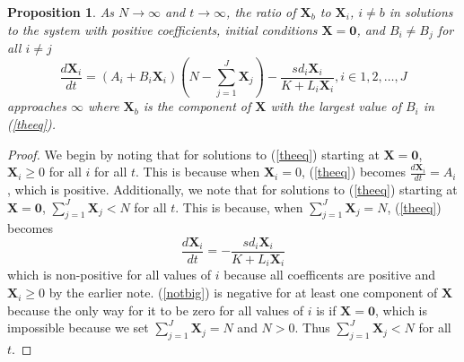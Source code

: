 \documentclass{article}
\newtheorem{prop}{Proposition}
\begin{document}
\begin{prop}
  As $N \rightarrow \infty$ and $t \rightarrow \infty$, the ratio of $\mathbf{X}_b$ to $\mathbf{X}_i$, $i\ne b$ in solutions to the system with positive coefficients, initial conditions $\mathbf{X} = \mathbf{0}$, and $B_i \ne B_j$ for all $i \ne j$
  \begin{equation}
    \frac{d \mathbf{X}_i}{dt} = (A_i + B_i\mathbf{X}_i)\left(N - \sum_{j=1}^J\mathbf{X}_j\right) - \frac{sd_i\mathbf{X}_i}{K+L_i\mathbf{X}_i}, i \in 1, 2, \dots, J
    \label{theeq}
  \end{equation}
  approaches $\infty$ where $\mathbf{X}_b$ is the component of $\mathbf{X}$ with the largest value of $B_i$ in (\ref{theeq}).
\end{prop}
\begin{proof}
  We begin by noting that for solutions to (\ref{theeq}) starting at $\mathbf{X} = \mathbf{0}$, $\mathbf{X}_i \ge 0$ for all $i$ for all $t$. This is because when $\mathbf{X}_i = 0$, (\ref{theeq}) becomes $\frac{d\mathbf{X}_i}{dt} = A_i$, which is positive. Additionally, we note that for solutions to (\ref{theeq}) starting at $\mathbf{X} = \mathbf{0}$, $\sum_{j=1}^J\mathbf{X}_j < N$ for all $t$. This is because, when $\sum_{j=1}^J\mathbf{X}_j = N$, (\ref{theeq}) becomes 
  \begin{equation}
  	\frac{d\mathbf{X}_i}{dt} = -\frac{sd_i\mathbf{X}_i}{K + L_i\mathbf{X}_i}
	\label{notbig}
  \end{equation}
  which is non-positive for all values of $i$ because all coefficents are positive and $\mathbf{X}_i \ge 0$ by the earlier note. (\ref{notbig}) is negative for at least one component of $\mathbf{X}$ because the only way for it to be zero for all values of $i$ is if $\mathbf{X} = \mathbf{0}$, which is impossible because we set $\sum_{j=1}^J \mathbf{X}_j = N$ and $N > 0$. Thus $\sum_{j=1}^J\mathbf{X}_j < N$ for all $t$.
  

\end{proof}
\end{document}
